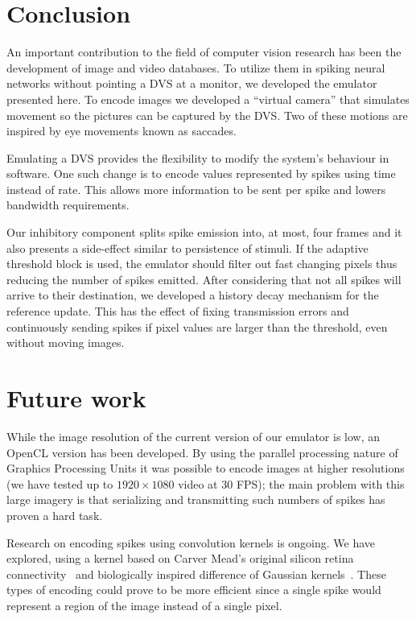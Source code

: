 \documentclass[conference]{IEEEtran}
\begin{document}
\section{Conclusion}
\label{sec:conclusions}
An important contribution to the field of computer vision research has been the development of image and video databases. To utilize them in spiking neural networks without pointing a DVS at a monitor, we developed the emulator presented here. To encode images we developed a ``virtual camera'' that simulates movement so the pictures can be captured by the DVS. Two of these motions are inspired by eye movements known as saccades.

Emulating a DVS provides the flexibility to modify the system's behaviour in software. One such change is to encode values represented by spikes using time instead of rate. This allows more information to be sent per spike and lowers bandwidth requirements. 

Our inhibitory component splits spike emission into, at most, four frames and it also presents a side-effect similar to persistence of stimuli. If the adaptive threshold block is used, the emulator should filter out fast changing pixels thus reducing the number of spikes emitted. After considering that not all spikes will arrive to their destination, we developed a history decay mechanism for the reference update. This has the effect of fixing transmission errors and continuously sending spikes if pixel values are larger than the threshold, even without moving images.

\section{Future work}
\label{sec:future-work}
While the image resolution of the current version of our emulator is low, an OpenCL version has been developed. By using the parallel processing nature of Graphics Processing Units it was possible to encode images at higher resolutions (we have tested up to $1920\times1080$ video at 30 FPS); the main problem with this large imagery is that serializing and transmitting such numbers of spikes has proven a hard task.

Research on encoding spikes using convolution kernels is ongoing. We have explored, using a kernel based on Carver Mead's original silicon retina connectivity~\cite{Mead1989} and biologically inspired difference of Gaussian kernels~\cite{basab}. These types of encoding could prove to be more efficient since a single spike would represent a region of the image instead of a single pixel.
\end{document}
